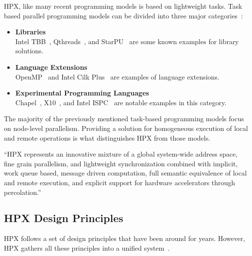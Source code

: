 HPX, like many recent programming models is based on lightweight tasks. Task based parallel programming models can be divided into three major categories~\cite{kaiser2014hpx,podobas2010comparison}:

\begin{itemize}
  \item \textbf{Libraries}\\
    Intel TBB~\cite{pheatt2008intel}, Qthreads~\cite{wheeler2008qthreads}, and StarPU~\cite{augonnet2011starpu} are some known examples for library solutions.
  \item \textbf{Language Extensions}\\
    OpenMP~\cite{dagum1998openmp} and Intel Cilk Plus~\cite{robison2012cilk} are examples of language extensions.
  \item \textbf{Experimental Programming Languages}\\
    Chapel~\cite{chamberlain2007parallel}, X10~\cite{pharr2012ispc}, and Intel ISPC~\cite{pharr2012ispc} are notable examples in this category.
\end{itemize}

The majority of the previously mentioned task-based programming models focus on node-level parallelism. Providing a solution for homogeneous execution of local and remote operations is what distinguishes HPX from those models.

``HPX represents an innovative mixture of a global system-wide address space, fine grain parallelism, and lightweight synchronization combined with implicit, work queue based, message driven computation, full semantic equivalence of local and remote execution, and explicit support for hardware accelerators
through percolation.''~\cite{kaiser2014hpx}


\subsection{HPX Design Principles}

HPX follows a set of design principles that have been around for years. However, HPX gathers all these principles into a unified system~\cite{kaiser2014hpx}.

